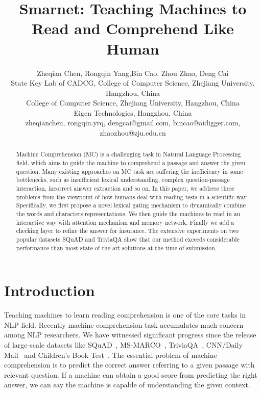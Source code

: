 \documentclass[letterpaper]{article} \usepackage{aaai18}  \usepackage{times}  \usepackage{helvet}  \usepackage{courier}  \usepackage{url}  \usepackage{graphicx}  \usepackage{booktabs}
\begin{document}
\title{Smarnet: Teaching Machines to Read and Comprehend Like Human}
\author{
	Zheqian Chen, Rongqin Yang,Bin Cao, Zhou Zhao,  Deng Cai\\
	State Key Lab of CADCG, College of Computer Science, Zhejiang University, Hangzhou, China\\
	College of Computer Science, Zhejiang University, Hangzhou, China\\
	Eigen Technologies, Hangzhou, China\\
	zheqianchen, rongqin.yrq, dengcai@gmail.com, bincao@aidigger.com, zhaozhou@zju.edu.cn \\
}
\maketitle

\begin{abstract}
Machine Comprehension (MC) is a challenging task in Natural Language Processing field, which aims to guide the machine to comprehend a passage and answer the given question. Many existing approaches on MC task are suffering the inefficiency in some bottlenecks, such as insufficient lexical understanding, complex question-passage interaction, incorrect answer extraction and so on. In this paper, we address these problems from the viewpoint of how humans deal with reading tests in a scientific way. Specifically, we first propose a novel lexical gating mechanism to dynamically combine the words and characters representations. We then guide the machines to read in an interactive way with attention mechanism and memory network. Finally we add a checking layer to refine the answer for insurance. The extensive experiments on two popular datasets SQuAD and TriviaQA show that our method exceeds considerable performance than most state-of-the-art solutions at the time of submission. 
\end{abstract}

\section{Introduction}
Teaching machines to learn reading comprehension is one of the core tasks in NLP field. Recently machine comprehension task accumulates much concern among NLP researchers. We have witnessed significant progress since the release of large-scale datasets like SQuAD~\cite{rajpurkar2016squad}, MS-MARCO~\cite{Nguyen2016MS}, TriviaQA~\cite{Joshi2017TriviaQAAL}, CNN/Daily Mail~\cite{Hermann2015TeachingMT} and Children's Book Test~\cite{Hill2015The}. The essential problem of machine comprehension is to predict the correct answer referring to a given passage with relevant question. If a machine can obtain a good score from predicting the right answer, we can say the machine is capable of understanding the given context.
\end{document}
